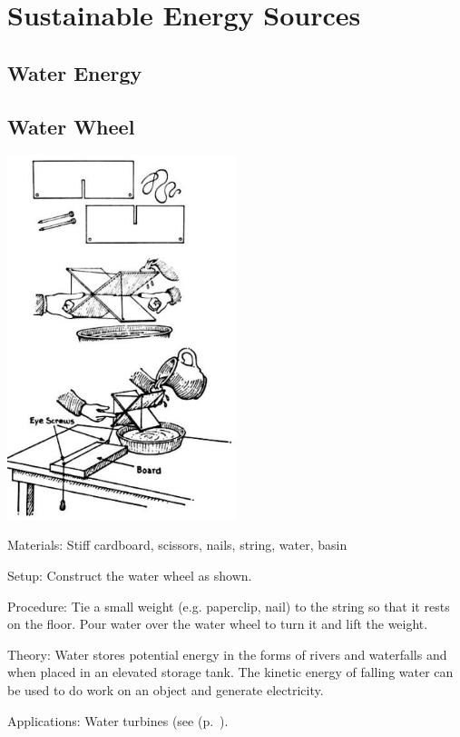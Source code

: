 \section{Sustainable Energy Sources}

\begin{multicols}{2}


\section*{Water Energy}


\subsection{Water Wheel}

\begin{center}
\includegraphics[width=0.5\textwidth]{./img/water-wheel.jpg}
\end{center}

\begin{description*}
\item[Materials:]{Stiff cardboard, scissors, nails, string, water, basin}
\item[Setup:]{Construct the water wheel as shown.}
\item[Procedure:]{Tie a small weight (e.g. paperclip, nail) to the string so that it rests on the floor. Pour water over the water wheel to turn it and lift the weight. }
\item[Theory:]{Water stores potential energy in the forms of rivers and waterfalls and when placed in an elevated storage tank. The kinetic energy of falling water can be used to do work on an object and generate electricity.}
\item[Applications:]{Water turbines (see  (p.~\pageref{sec:electromagnetism}).}
\end{description*}


\end{multicols}
